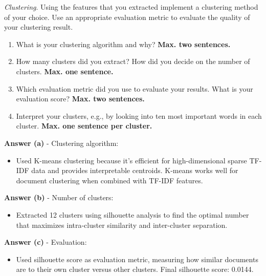 \documentclass[a4paper,10pt]{article}
\begin{document}
\begin{enumerate}[topsep=0mm, partopsep=0mm, leftmargin=*]
\clearpage
{\color{blue}
	\clearpage\item\textit{Clustering}. Using the features that you extracted implement a clustering method of your choice. Use an appropriate evaluation metric to evaluate the quality of your clustering result.
	\begin{enumerate}
		\item What is your clustering algorithm and why? {\color{red}\textbf{Max. two sentences.}}
		\item How many clusters did you extract? How did you decide on the number of clusters. {\color{red}\textbf{Max. one sentence.}}
		\item Which evaluation metric did you use to evaluate your results. What is your evaluation score? {\color{red}\textbf{Max. two sentences.}}
		\item Interpret your clusters, e.g., by looking into ten most important words in each cluster. {\color{red}\textbf{Max. one sentence per cluster.}}
\end{enumerate}}

\textbf{Answer (a)} - Clustering algorithm:
\begin{itemize}
	\item Used K-means clustering because it's efficient for high-dimensional sparse TF-IDF data and provides interpretable centroids. K-means works well for document clustering when combined with TF-IDF features.
\end{itemize}

\textbf{Answer (b)} - Number of clusters:
\begin{itemize}
	\item Extracted 12 clusters using silhouette analysis to find the optimal number that maximizes intra-cluster similarity and inter-cluster separation.
\end{itemize}

\textbf{Answer (c)} - Evaluation:
\begin{itemize}
	\item Used silhouette score as evaluation metric, measuring how similar documents are to their own cluster versus other clusters. Final silhouette score: 0.0144.
\end{itemize}


\end{enumerate}
\end{document}
